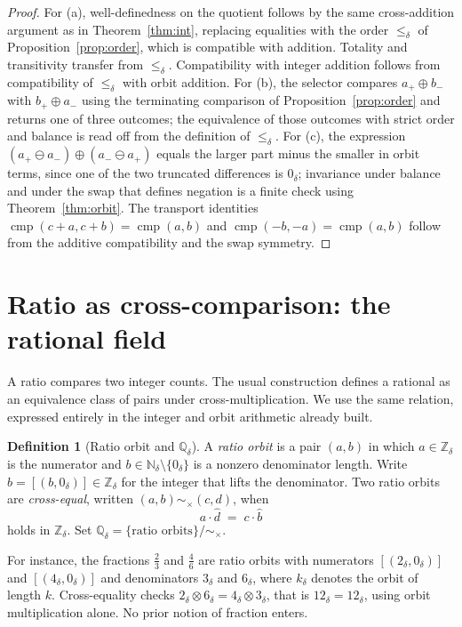 \documentclass[11pt,a4paper]{article}
\theoremstyle{definition}
\newtheorem{definition}[theorem]{Definition}
\theoremstyle{remark}
\newcommand{\Nd}{\mathbb{N}_\delta}
\newcommand{\Zd}{\mathbb{Z}_\delta}
\newcommand{\Qd}{\mathbb{Q}_\delta}
\newcommand{\zd}{0_\delta}
\newcommand{\oad}{\oplus}
\newcommand{\omd}{\otimes}
\begin{document}
\begin{proof}
For (a), well-definedness on the quotient follows by the same cross-addition
argument as in Theorem~\ref{thm:int}, replacing equalities with the order
$\leq_\delta$ of Proposition~\ref{prop:order}, which is compatible with
addition. Totality and transitivity transfer from $\leq_\delta$. Compatibility
with integer addition follows from compatibility of $\leq_\delta$ with orbit
addition. For (b), the selector compares $a_+ \oad b_-$ with $b_+ \oad a_-$
using the terminating comparison of Proposition~\ref{prop:order} and returns one
of three outcomes; the equivalence of those outcomes with strict order and
balance is read off from the definition of $\leq_\delta$. For (c), the
expression $(a_+ \ominus a_-) \oad (a_- \ominus a_+)$ equals the larger part
minus the smaller in orbit terms, since one of the two truncated differences is
$\zd$; invariance under balance and under the swap that defines negation is a
finite check using Theorem~\ref{thm:orbit}. The transport identities
$\operatorname{cmp}(c + a, c + b) = \operatorname{cmp}(a, b)$ and
$\operatorname{cmp}(-b, -a) = \operatorname{cmp}(a, b)$ follow from the additive
compatibility and the swap symmetry.
\end{proof}

\section{Ratio as cross-comparison: the rational field}\label{sec:ratio}

A ratio compares two integer counts. The usual construction defines a rational
as an equivalence class of pairs under cross-multiplication. We use the same
relation, expressed entirely in the integer and orbit arithmetic already built.

\begin{definition}[Ratio orbit and $\Qd$]\label{def:ratioorbit}
A \emph{ratio orbit} is a pair $(a, b)$ in which $a \in \Zd$ is the numerator
and $b \in \Nd \setminus \{\zd\}$ is a nonzero denominator length. Write
$\widehat{b} = [(b, \zd)] \in \Zd$ for the integer that lifts the denominator.
Two ratio orbits are \emph{cross-equal}, written $(a, b) \sim_\times (c, d)$,
when
\[
  a \cdot \widehat{d} \;=\; c \cdot \widehat{b}
\]
holds in $\Zd$. Set $\Qd = \{\text{ratio orbits}\} / {\sim_\times}$.
\end{definition}

For instance, the fractions $\tfrac{2}{3}$ and $\tfrac{4}{6}$ are ratio orbits
with numerators $[(2_\delta, \zd)]$ and $[(4_\delta, \zd)]$ and denominators
$3_\delta$ and $6_\delta$, where $k_\delta$ denotes the orbit of length $k$.
Cross-equality checks $2_\delta \omd 6_\delta = 4_\delta \omd 3_\delta$, that is
$12_\delta = 12_\delta$, using orbit multiplication alone. No prior notion of
fraction enters.
\end{document}
